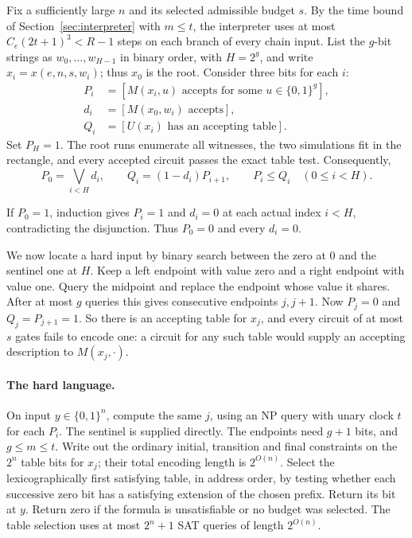 \documentclass[12pt,letterpaper]{article}
\newcommand{\bits}{\{0,1\}}
\begin{document}
Fix a sufficiently large \(n\) and its selected admissible budget \(s\).
By the time bound of Section~\ref{sec:interpreter} with \(m\le t\), the
interpreter uses at most \(C_e(2t+1)^3<R-1\) steps on each branch of every
chain input. List the \(g\)-bit strings as \(w_0,\ldots,w_{H-1}\) in binary
order, with \(H=2^g\), and write \(x_i=x(e,n,s,w_i)\); thus \(x_0\) is the
root. Consider three bits for each \(i\):
\begin{align*}
 P_i & = [M(x_i,u)\text{ accepts for some }u\in\bits^g],\\
 d_i & = [M(x_0,w_i)\text{ accepts}],\\
 Q_i & = [U(x_i)\text{ has an accepting table}].
\end{align*}
Set \(P_H=1\). The root runs enumerate all witnesses, the two simulations
fit in the rectangle, and every accepted circuit passes the exact table
test. Consequently,
\[
       P_0=\bigvee_{i<H}d_i,\qquad
       Q_i=(1-d_i)P_{i+1},\qquad P_i\le Q_i \quad(0\le i<H).
\]

If \(P_0=1\), induction gives \(P_i=1\) and \(d_i=0\) at each actual index
\(i<H\), contradicting the disjunction. Thus \(P_0=0\) and every \(d_i=0\).

We now locate a hard input by binary search between the zero at \(0\) and
the sentinel one at \(H\). Keep a left endpoint with value zero and a right
endpoint with value one. Query the midpoint and replace the endpoint whose
value it shares. After at most \(g\) queries this gives consecutive endpoints
\(j,j+1\). Now \(P_j=0\) and \(Q_j=P_{j+1}=1\). So there is an accepting
table for \(x_j\), and every circuit of at most \(s\) gates fails to encode
one: a circuit for any such table would supply an accepting description to
\(M(x_j,\cdot)\).

\paragraph{The hard language.}
On input \(y\in\bits^n\), compute the same \(j\), using an NP query with
unary clock \(t\) for each \(P_i\). The sentinel is supplied directly. The
endpoints need \(g+1\) bits, and \(g\le m\le t\). Write out the ordinary
initial, transition and final constraints on the \(2^n\) table bits for
\(x_j\); their total encoding length is \(2^{O(n)}\). Select the
lexicographically first satisfying table, in address order, by testing
whether each successive zero bit has a satisfying extension of the chosen
prefix. Return its bit at \(y\). Return zero if the formula is
unsatisfiable or no budget was selected. The table selection uses at most
\(2^n+1\) SAT queries of length \(2^{O(n)}\).
\end{document}
